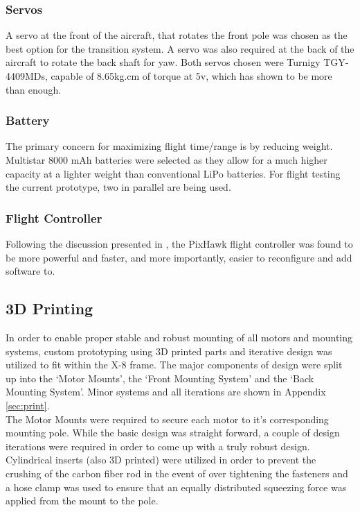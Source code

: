 \subsubsection*{Servos}
A servo at the front of the aircraft, that rotates the front pole was chosen as the best option for the transition system. A servo was also required at the back of the aircraft to rotate the back shaft for yaw. Both servos chosen were Turnigy TGY-4409MDs, capable of 8.65kg.cm of torque at 5v, which has shown to be more than enough. 
		
\subsubsection*{Battery}
The primary concern for maximizing flight time/range is by reducing weight. Multistar 8000 mAh batteries were selected as they allow for a much higher capacity at a lighter weight than conventional LiPo batteries. For flight testing the current prototype, two in parallel are being used. 
	
\subsubsection*{Flight Controller}
Following the discussion presented in \cite{ref:controller_comparison}, the PixHawk flight controller was found to be more powerful and faster, and more importantly, easier to reconfigure and add software to.

\subsection{3D Printing}
In order to enable proper stable and robust mounting of all motors and mounting systems, custom prototyping using 3D printed parts and iterative design was utilized to fit within the X-8 frame. The major components of design were split up into the `Motor Mounts', the `Front  Mounting System' and the `Back Mounting System'. Minor systems and all iterations are shown in Appendix \ref{sec:print}.\\

The Motor Mounts were required to secure each motor to it's corresponding mounting pole. While the basic design was straight forward, a couple of design iterations were required in order to come up with a truly robust design. Cylindrical inserts (also 3D printed) were utilized in order to prevent the crushing of the carbon fiber rod in the event of over tightening the fasteners and a hose clamp was used to ensure that an equally distributed squeezing force was applied from the mount to the pole.\\

